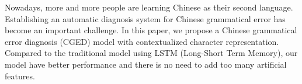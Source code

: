 Nowadays, more and more people are learning Chinese as their second language. Establishing an automatic diagnosis system for Chinese grammatical error has become an important challenge. In this paper, we propose a Chinese grammatical error diagnosis (CGED) model with contextualized character representation. Compared to the traditional model using LSTM (Long-Short Term Memory), our model have better performance and there is no need to add too many artificial features.
